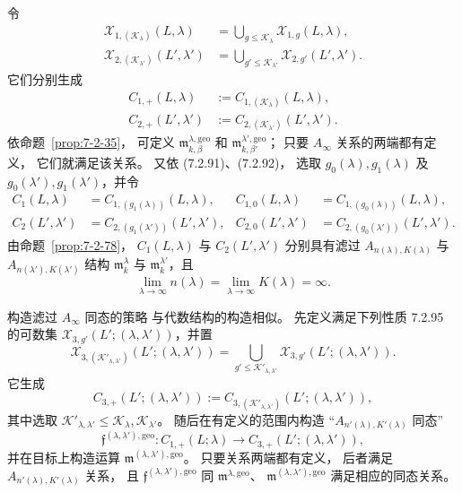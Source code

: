 令
\[
\begin{aligned}
\mathcal X_{1,(\mathcal K_\lambda)}(L,\lambda)
&=\bigcup_{g\le\mathcal K_\lambda}
\mathcal X_{1,g}(L,\lambda),\\
\mathcal X_{2,(\mathcal K_{\lambda'})}(L',\lambda')
&=\bigcup_{g'\le\mathcal K_{\lambda'}}
\mathcal X_{2,g'}(L',\lambda').
\end{aligned}
\]
它们分别生成
\[
\begin{aligned}
C_{1,+}(L,\lambda)
&:=C_{1,(\mathcal K_\lambda)}(L,\lambda),\\
C_{2,+}(L',\lambda')
&:=C_{2,(\mathcal K_{\lambda'})}(L',\lambda').
\end{aligned}
\]
依命题~\ref{prop:7-2-35}，
可定义 $\mathfrak m^{\lambda,\mathrm{geo}}_{k,\beta}$
和 $\mathfrak m^{\lambda',\mathrm{geo}}_{k,\beta'}$；
只要 $A_\infty$ 关系的两端都有定义，
它们就满足该关系。
又依 (7.2.91)、(7.2.92)，
选取 $g_0(\lambda),g_1(\lambda)$
及 $g_0(\lambda'),g_1(\lambda')$，并令
\[
\begin{aligned}
C_1(L,\lambda)
&=C_{1,(g_1(\lambda))}(L,\lambda),&
C_{1,0}(L,\lambda)
&=C_{1,(g_0(\lambda))}(L,\lambda),\\
C_2(L',\lambda')
&=C_{2,(g_1(\lambda'))}(L',\lambda'),&
C_{2,0}(L',\lambda')
&=C_{2,(g_0(\lambda'))}(L',\lambda').
\end{aligned}
\]
由命题~\ref{prop:7-2-78}，
$C_1(L,\lambda)$ 与 $C_2(L',\lambda')$
分别具有滤过
$A_{n(\lambda),K(\lambda)}$
与 $A_{n(\lambda'),K(\lambda')}$ 结构
$\mathfrak m^\lambda_k$
与 $\mathfrak m^{\lambda'}_k$，且
\[
\lim_{\lambda\to\infty}n(\lambda)
=\lim_{\lambda\to\infty}K(\lambda)=\infty.
\]

构造滤过 $A_\infty$ 同态的策略
与代数结构的构造相似。
先定义满足下列性质 7.2.95 的可数集
$\mathcal X_{3,g'}(L';(\lambda,\lambda'))$，并置
\[
\mathcal X_{3,(\mathcal K'_{\lambda,\lambda'})}
(L';(\lambda,\lambda'))
=\bigcup_{g'\le\mathcal K'_{\lambda,\lambda'}}
\mathcal X_{3,g'}(L';(\lambda,\lambda')).
\]
它生成
\[
C_{3,+}(L';(\lambda,\lambda'))
:=C_{3,(\mathcal K'_{\lambda,\lambda'})}
(L';(\lambda,\lambda')),
\]
其中选取
$\mathcal K'_{\lambda,\lambda'}
\le\mathcal K_\lambda,\mathcal K_{\lambda'}$。
随后在有定义的范围内构造
``$A_{n'(\lambda),K'(\lambda)}$ 同态''
\[
\mathfrak f^{(\lambda,\lambda'),\mathrm{geo}}\colon
C_{1,+}(L;\lambda)
\longrightarrow C_{3,+}(L';(\lambda,\lambda')),
\]
并在目标上构造运算
$\mathfrak m^{(\lambda,\lambda'),\mathrm{geo}}$。
只要关系两端都有定义，
后者满足 $A_{n'(\lambda),K'(\lambda)}$ 关系，
且 $\mathfrak f^{(\lambda,\lambda'),\mathrm{geo}}$
同 $\mathfrak m^{\lambda,\mathrm{geo}}$、
$\mathfrak m^{(\lambda,\lambda'),\mathrm{geo}}$
满足相应的同态关系。

